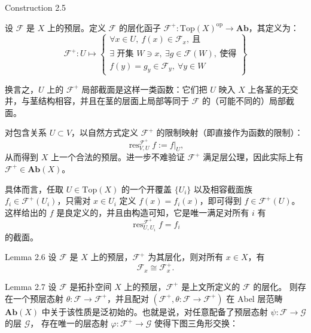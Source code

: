 \documentclass{beamer}
\begin{document}
\begin{frame}
\begin{block}{Construction 2.5}

设 $\mathcal{F}$ 是 $X$ 上的预层。定义 $\mathcal{F}$ 的层化函子
$\mathcal{F}^+: \mathrm{Top}(X)^\mathrm{op} \to \mathbf{Ab}$，其定义为：
\[
\mathcal{F}^+: U \longmapsto \left\{
\begin{array}{l}
\forall x \in U,\ f(x) \in \mathcal{F}_x,\ \text{且} \\
\exists \text{ 开集 } W \ni x,\ \exists g \in \mathcal{F}(W),\ \text{使得} \\
f(y)=g_y \in \mathcal{F}_y,\ \forall y \in W
\end{array}
\right\} \tag{4.9}
\]
\end{block}
\end{frame}

\begin{frame}

换言之，$U$ 上的 $\mathcal{F}^+$ 局部截面是这样一类函数：它们把 $U$ 映入 $X$ 上各茎的无交并，与茎结构相容，并且在茎的层面上局部等同于 $\mathcal{F}$ 的（可能不同的）局部截面。

对包含关系 $U \subset V$，以自然方式定义 $\mathcal{F}^+$ 的限制映射（即直接作为函数的限制）：
\[
\operatorname{res}_{V,U}^{\mathcal{F}^+}f := f|_U,
\]
从而得到 $X$ 上一个合法的预层。进一步不难验证 $\mathcal{F}^+$ 满足层公理，因此实际上有 $\mathcal{F}^+ \in \mathbf{Ab}(X)$。

具体而言，任取 $U\in\mathrm{Top}(X)$ 的一个开覆盖 $\{U_i\}$ 以及相容截面族 $f_i\in\mathcal{F}^+(U_i)$，只需对 $x\in U_i$ 定义 $f(x)=f_i(x)$，即可得到 $f\in\mathcal{F}^+(U)$。这样给出的 $f$ 是良定义的，并且由构造可知，它是唯一满足对所有 $i$ 有
\[
\operatorname{res}_{U,U_i}^{\mathcal{F}^+}f = f_i
\]
的截面。
\end{frame}
\begin{frame}
\begin{block}{Lemma 2.6}
设 $\mathcal{F}$ 是 $X$ 上的预层，$\mathcal{F}^+$ 为其层化，则对所有 $x \in X$，有
\[
\mathcal{F}_x \cong \mathcal{F}_x^+.
\]
\end{block}
\begin{block}{Lemma 2.7}
设 $\mathcal{F}$ 是拓扑空间 $X$ 上的预层，$\mathcal{F}^+$ 是上文所定义的 $\mathcal{F}$ 的层化。
则存在一个预层态射 $\theta: \mathcal{F}\to\mathcal{F}^+$，并且配对
$(\mathcal{F}^+,\theta: \mathcal{F}\to\mathcal{F}^+)$
在 Abel 层范畴 $\mathbf{Ab}(X)$ 中关于该性质是泛初始的。也就是说，对任意配备了预层态射
$\psi: \mathcal{F}\to\mathcal{G}$ 的层 $\mathcal{G}$，
存在唯一的层态射 $\varphi: \mathcal{F}^+\to\mathcal{G}$ 使得下图三角形交换：
\end{block}

\end{frame}
\end{document}
